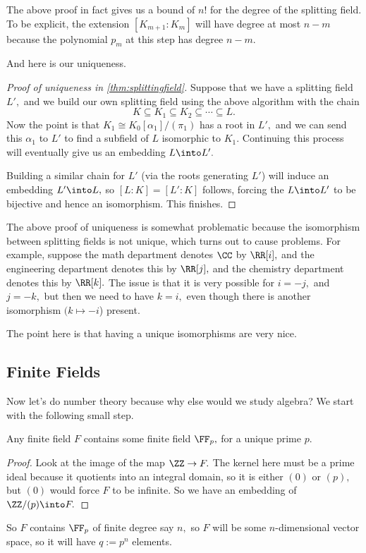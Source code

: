 \begin{remark}
	The above proof in fact gives us a bound of $n!$ for the degree of the splitting field. To be explicit, the extension $[K_{m+1}:K_m]$ will have degree at most $n-m$ because the polynomial $p_m$ at this step has degree $n-m.$
\end{remark}
And here is our uniqueness.
\begin{proof}[Proof of uniqueness in \autoref{thm:splittingfield}]
	Suppose that we have a splitting field $L',$ and we build our own splitting field using the above algorithm with the chain
	\[K\subseteq K_1\subseteq K_2\subseteq\cdots\subseteq L.\]
	Now the point is that $K_1\cong K_0[\alpha_1]/(\pi_1)$ has a root in $L',$ and we can send this $\alpha_1$ to $L'$ to find a subfield of $L$ isomorphic to $K_1.$ Continuing this process will eventually give us an embedding $L\into L'.$
	
	Building a similar chain for $L'$ (via the roots generating $L'$) will induce an embedding $L'\into L,$ so $[L:K]=[L':K]$ follows, forcing the $L\into L'$ to be bijective and hence an isomorphism. This finishes.
\end{proof}
\begin{remark}
	The above proof of uniqueness is somewhat problematic because the isomorphism between splitting fields is not unique, which turns out to cause problems. For example, suppose the math department denotes $\CC$ by $\RR[i],$ and the engineering department denotes this by $\RR[j],$ and the chemistry department denotes this by $\RR[k].$ The issue is that it is very possible for $i=-j,$ and $j=-k,$ but then we need to have $k=i,$ even though there is another isomorphism $(k\mapsto-i$) present.
\end{remark}
\begin{remark}
	The point here is that having a unique isomorphisms are very nice.
\end{remark}

\subsection{Finite Fields}
Now let's do number theory because why else would we study algebra? We start with the following small step.
\begin{proposition}
	Any finite field $F$ contains some finite field $\FF_p,$ for a unique prime $p.$
\end{proposition}
\begin{proof}
	Look at the image of the map $\ZZ\to F.$ The kernel here must be a prime ideal because it quotients into an integral domain, so it is either $(0)$ or $(p),$ but $(0)$ would force $F$ to be infinite. So we have an embedding of $\ZZ/(p)\into F.$
\end{proof}
So $F$ contains $\FF_p$ of finite degree say $n,$ so $F$ will be some $n$-dimensional vector space, so it will have $q:=p^n$ elements.

